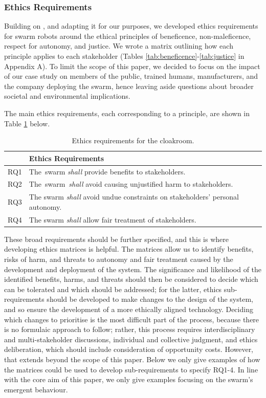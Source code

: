 \documentclass[lettersize,journal]{IEEEtran}
\begin{document}
\subsubsection{Ethics Requirements}\label{ethics-r}
Building on \cite{Porter2022}, and adapting it for our purposes, we developed ethics requirements for swarm robots around the ethical principles of beneficence, non-maleficence, respect for autonomy, and justice. We wrote a matrix outlining how each principle applies to each stakeholder (Tables  \ref{tab:beneficence}-\ref{tab:justice} in Appendix A). To limit the scope of this paper, we decided to focus on the impact of our case study on members of the public, trained humans, manufacturers, and the company deploying the swarm, hence leaving aside questions about broader societal and environmental implications.

The main ethics requirements, each corresponding to a principle, are shown in Table \ref{tab:ethics} below. 
\begin{table}[!h]
	\centering
	\begin{tabular}{|p{9mm}|p{72mm}|}
		\hline
		& \textbf{ Ethics Requirements} \\
		\hline
		RQ1 & The swarm \textit{shall} provide benefits to stakeholders. \\ 
		\hline
		RQ2 & The swarm \textit{shall} avoid causing unjustified harm to stakeholders. \\ 
		\hline
		RQ3 & The swarm \textit{shall} avoid undue constraints on stakeholders' personal autonomy. \\
		\hline
		RQ4 & The swarm \textit{shall} allow fair treatment of stakeholders.  \\		[1ex] 		
		\hline
	\end{tabular}
	\caption{\label{tab:ethics}Ethics requirements for the cloakroom.}
\end{table}  

These broad requirements should be further specified, and this is where developing ethics matrices is helpful. The matrices allow us to identify benefits, risks of harm, and threats to autonomy and fair treatment caused by the development and deployment of the system. The significance and likelihood of the identified benefits, harms, and threats should then be considered to decide which can be tolerated and which should be addressed; for the latter, ethics sub-requirements should be developed to make changes to the design of the system, and so ensure the development of a more ethically aligned technology. Deciding which changes to prioritise is the most difficult part of the process, because there is no formulaic approach to follow; rather, this process requires interdisciplinary and multi-stakeholder discussions, individual and collective judgment, and ethics deliberation, which should include consideration of opportunity costs. However, that extends beyond the scope of this paper. Below we only give examples of how the matrices could be used to develop sub-requirements to specify RQ1-4. In line with the core aim of this paper, we only give examples focusing on the swarm's emergent behaviour.
\\
\end{document}
